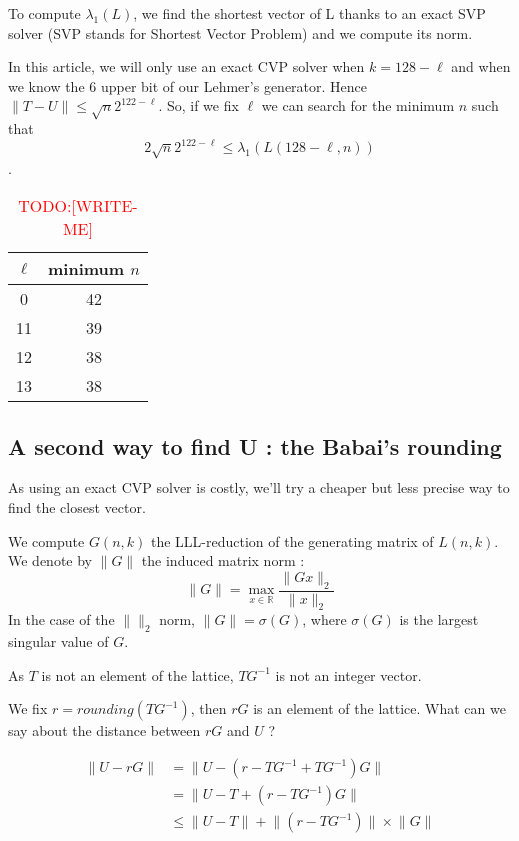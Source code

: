 \documentclass[preprint,svgnames]{iacrtrans}
\newcommand{\todo}[1]{\textcolor{red}{TODO:[#1]}}
\begin{document}
To compute \(\lambda_1(L)\), we find the shortest vector of L thanks to an exact SVP solver (SVP stands for Shortest Vector Problem) and we compute its norm.

In this article, we will only use an exact CVP solver when \(k = 128-\ell\) and when we know the \(6\) upper bit of our Lehmer's generator. Hence \(\lVert T-U \rVert \leqslant \sqrt{n}2^{122-\ell} \). So, if we fix \(\ell\) we can search for the minimum \(n\) such that \[2\sqrt{n}2^{122-\ell} \leqslant \lambda_1(L(128-\ell,n))\].

\begin{table}[htbp!]
  \centering
    \begin{tabular}{|c|c|}
	\hline
	\(\ell\)  & minimum \(n\) \\
	\hline
	0  & 42 \\
	11 & 39 \\
	12 & 38 \\
	13 & 38 \\
	\hline
\end{tabular}
  \caption{\todo{WRITE-ME}}
  \label{tab:exact_cvp}
\end{table}

\subsection{A second way to find U : the Babai's rounding}

As using an exact CVP solver is costly, we'll try a cheaper but less precise way to find the closest vector.

We compute \(G(n,k)\) the LLL-reduction of the generating matrix of \(L(n,k)\). We denote by  \(\rVert G \lVert\) the induced matrix norm :
\[\rVert G \lVert =  \max_{x \in \mathbb{R}}\frac{\lVert Gx \rVert_2}{\lVert x \rVert_2}\]
In the case of the \(\lVert\rVert_2\) norm, \(\rVert G \lVert = \sigma(G)\), where \(\sigma(G)\) is the largest singular value of \(G\). 

\medskip

As \(T\) is not an element of the lattice, \(TG^{-1}\) is not an integer vector.

We fix \(r = rounding(TG^{-1}) \), then \(rG\) is an element of the lattice. What can we say about the distance between \(rG\) and \(U\) ?

\begin{align*}
\lVert U - rG \rVert &= \lVert U - (r-TG^{-1} + TG^{-1})G \rVert\\
&= \lVert U - T + (r-TG^{-1})G \rVert\\
&\leqslant \lVert U - T \rVert + \lVert(r-TG^{-1})\rVert \times \lVert G\rVert\\	
\end{align*}
\end{document}
